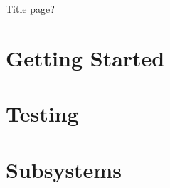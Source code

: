 \documentclass[12pt]{article}
\begin{document}
Title page?
\pagebreak

\tableofcontents

\section{Getting Started}


\section{Testing}

\pagebreak


\pagebreak


\pagebreak

\section{Subsystems}

\pagebreak


\pagebreak


\pagebreak


\pagebreak
\end{document}

